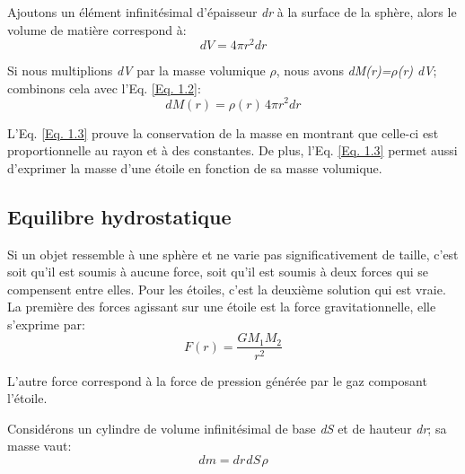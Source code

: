 Ajoutons un élément infinitésimal d'épaisseur \textit{dr} à la surface de la sphère, alors le volume de matière correspond à:\begin{equation} dV=4\pi r^{2}dr\label{Eq. 1.2}\end{equation}

Si nous multiplions \textit{dV} par la masse volumique \textit{$\rho$}, nous avons\textit{ dM(r)=$\rho$(r) dV}; combinons cela avec l'Eq. \ref{Eq. 1.2}:\begin{equation} \boxed{dM(r)=\rho(r)\hspace{2pt}4\pi r^{2}dr}\label{Eq.
	1.3}\end{equation}


\vfill
{}

L'Eq. \ref{Eq. 1.3} prouve la conservation de la masse en montrant que celle-ci est proportionnelle au rayon et à des constantes. De plus, l'Eq. \ref{Eq. 1.3} permet aussi d'exprimer la masse d'une étoile en fonction de sa masse volumique.

\subsection{Equilibre hydrostatique}\label{1.1.2}

Si un objet ressemble à une sphère et ne varie pas significativement de taille, c'est soit qu'il est soumis à aucune force, soit qu'il est soumis à deux forces qui se compensent entre elles. Pour les étoiles, c'est la deuxième solution qui est vraie. La première des forces agissant sur une étoile est la force gravitationnelle, elle s'exprime par: \begin{equation} F(r)=\frac{GM_{1}M_{2}}{r^{2}}\label{Eq. 1.4}\end{equation}

L'autre force correspond à la force de pression générée par le gaz composant l'étoile.\smallskip

Considérons un cylindre de volume infinitésimal de base \textit{dS} et de hauteur \textit{dr}; sa masse vaut:\begin{equation}dm=dr\hspace{1pt}dS\hspace{1pt}\rho\label{Eq. 1.5}\end{equation} 

